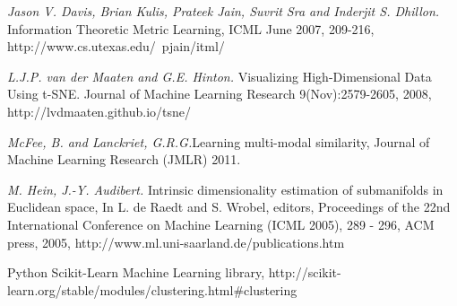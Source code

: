 \documentclass[12pt]{article}
\begin{document}
\begin{thebibliography}{5}
\textit{Jason V. Davis, Brian Kulis, Prateek Jain, Suvrit Sra and Inderjit S. Dhillon.} Information Theoretic Metric Learning, ICML June 2007, 209-216,  http://www.cs.utexas.edu/~pjain/itml/

\textit{L.J.P. van der Maaten and G.E. Hinton.} Visualizing High-Dimensional Data Using t-SNE. Journal of Machine Learning Research 9(Nov):2579-2605, 2008, http://lvdmaaten.github.io/tsne/

\textit{McFee, B. and Lanckriet, G.R.G.}Learning multi-modal similarity, Journal of Machine Learning Research (JMLR) 2011.

\textit{M. Hein, J.-Y. Audibert. }Intrinsic dimensionality estimation of submanifolds in Euclidean space,
In L. de Raedt and S. Wrobel, editors, Proceedings of the 22nd International Conference on Machine Learning (ICML 2005), 289 - 296, ACM press, 2005, http://www.ml.uni-saarland.de/publications.htm

 Python Scikit-Learn Machine Learning library, http://scikit-learn.org/stable/modules/clustering.html\#clustering

\end{thebibliography}
\end{document}
